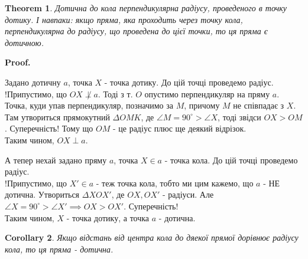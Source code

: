 \documentclass[a4paper, 10pt]{article}
\makeatletter
\def\qed{$\blacksquare$}
\theoremstyle{theoremdd}
\newtheorem{theorem}{Theorem}[subsection]
\theoremstyle{theoremdd}
\theoremstyle{theoremdd}
\theoremstyle{theoremdd}
\theoremstyle{theoremdd}
\theoremstyle{theoremdd}
\theoremstyle{theoremdd}
\theoremstyle{theoremdd}
\theoremstyle{theoremdd}
\newtheorem{corollary}[theorem]{Corollary}
\renewenvironment{proof}[1][Proof.\\]{\par
\pushQED{\hfill \qed}%
\normalfont \topsep6\p@\@plus6\p@\relax
\trivlist
\item\relax
{\bfseries
#1\@addpunct{.}}\hspace\labelsep\ignorespaces
}{%
\popQED\endtrivlist\@endpefalse
}
\makeatother
\begin{document}
\begin{theorem}
Дотична до кола перпендикулярна радіусу, проведеного в точку дотику. І навпаки: якщо пряма, яка проходить через точку кола, перпендикулярна до радіусу, що проведена до цієї точки, то ця пряма є дотичною.
\end{theorem}

\begin{proof}
Задано дотичну $a$, точка $X$ - точка дотику. До цій точці проведемо радіус.\\
!Припустимо, що $OX \not \perp a$. Тоді з т. $O$ опустимо перпендикуляр на пряму $a$. Точка, куди упав перпендикуляр, позначимо за $M$, причому $M$ не співпадає з $X$.\\
Там утвориться прямокутний $\Delta OMK$, де $\angle M = 90^\circ > \angle X$, тоді звідси $OX > OM$. Суперечність! Тому що $OM$ - це радіус плюс ще деякий відрізок.\\
Таким чином, $OX \perp a$.
\begin{figure}[H]
\centering
{}
\end{figure}
А тепер нехай задано пряму $a$, точка $X \in a$ - точка кола. До цій точці проведемо радіус.\\
!Припустимо, що $X' \in a$ - теж точка кола, тобто ми цим кажемо, що $a$ - НЕ дотична. Утвориться $\Delta XOX'$, де $OX,OX'$ - радіуси. Але $\angle X = 90^\circ > \angle X' \implies OX > OX'$. Суперечність!\\
Таким чином, $X$ - точка дотику, а точка $a$ - дотична.
\end{proof}

\begin{corollary}
Якщо відстань від центра кола до дяекої прямої дорівнює радіусу кола, то ця пряма - дотична.
\end{corollary}
\end{document}
